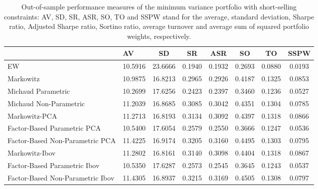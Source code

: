 \begin{table}

\caption{\label{tab:empirical_mvp}Out-of-sample performance measures of the minimum variance portfolio with short-selling constraints: AV, SD, SR, ASR, SO, TO and SSPW stand for the average, standard deviation, Sharpe ratio, Adjusted Sharpe ratio, Sortino ratio, average turnover and average sum of squared portfolio weights, respectively.}
\centering
\begin{tabular}[t]{l|l|c|c|c|c|c|c}
\hline
  & AV & SD & SR & ASR & SO & TO & SSPW\\
\hline
EW & 10.5916 & 23.6666 & 0.1940 & 0.1932 & 0.2693 & 0.0880 & 0.0193\\
\hline
Markowitz & 10.9875 & 16.8213 & 0.2965 & 0.2926 & 0.4187 & 0.1325 & 0.0853\\
\hline
Michaud Parametric & 10.2699 & 17.6256 & 0.2423 & 0.2397 & 0.3460 & 0.1236 & 0.0527\\
\hline
Michaud Non-Parametric & 11.2039 & 16.8685 & 0.3085 & 0.3042 & 0.4351 & 0.1304 & 0.0785\\
\hline
Markowitz-PCA & 11.2713 & 16.8193 & 0.3134 & 0.3092 & 0.4397 & 0.1318 & 0.0866\\
\hline
Factor-Based Parametric PCA & 10.5400 & 17.6054 & 0.2579 & 0.2550 & 0.3666 & 0.1247 & 0.0536\\
\hline
Factor-Based Non-Parametric PCA & 11.4225 & 16.9174 & 0.3205 & 0.3160 & 0.4495 & 0.1303 & 0.0795\\
\hline
Markowitz-Ibov & 11.2802 & 16.8161 & 0.3140 & 0.3098 & 0.4404 & 0.1318 & 0.0867\\
\hline
Factor-Based Parametric Ibov & 10.5350 & 17.6287 & 0.2573 & 0.2545 & 0.3645 & 0.1243 & 0.0537\\
\hline
Factor-Based Non-Parametric Ibov & 11.4305 & 16.8937 & 0.3215 & 0.3169 & 0.4505 & 0.1308 & 0.0797\\
\hline
\end{tabular}
\end{table}
